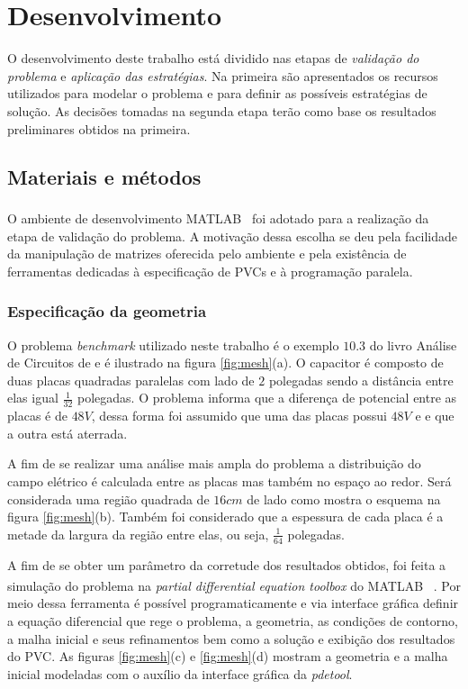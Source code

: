 \documentclass[
    12pt,               %
    openright,          %
    oneside,
    a4paper,            %
    english,            %
    french,             %
    spanish,            %
    brazil              %
    ]{abntex2}
\newcommand{\matlab}{MATLAB\textsuperscript{\textregistered} \ }
\begin{document}
\chapter{Desenvolvimento}

O desenvolvimento deste trabalho está  dividido nas etapas de \textit{validação do problema} e \textit{aplicação das estratégias}. Na primeira são apresentados os recursos utilizados para modelar o problema e para definir as possíveis estratégias de solução. As decisões tomadas na segunda etapa terão como base os resultados preliminares obtidos na primeira. 

\section{Materiais e métodos}
O ambiente de desenvolvimento \matlab foi adotado para a realização da etapa de validação do problema. A motivação dessa escolha se deu pela facilidade da manipulação de matrizes oferecida pelo ambiente e pela existência de ferramentas dedicadas à especificação de PVCs e à programação paralela.

\subsection{Especificação da geometria}
O problema \textit{benchmark} utilizado neste trabalho é o exemplo $10.3$ do livro Análise de Circuitos de  e é ilustrado na figura \ref{fig:mesh}{(a)}. O capacitor é composto de duas placas quadradas paralelas com lado de $2$ polegadas sendo a distância entre elas igual $\frac{1}{32}$ polegadas. O problema informa que a diferença de potencial entre as placas é de $48V$, dessa forma foi assumido que uma das placas possui $48V$ e e que a outra está aterrada.

A fim de se realizar uma análise mais ampla do problema a distribuição do campo elétrico é calculada entre as placas mas também no espaço ao redor. Será considerada uma região quadrada de $16cm$ de lado como mostra o esquema na figura \ref{fig:mesh}{(b)}. Também foi considerado que a espessura de cada placa é a metade da largura da região entre elas, ou seja, $\frac{1}{64}$ polegadas.


A fim de se obter um parâmetro da corretude dos resultados obtidos, foi feita a simulação do problema na \textit{partial differential equation toolbox} do \matlab. Por meio dessa ferramenta é possível programaticamente e via interface gráfica definir a equação diferencial que rege o problema, a geometria, as condições de contorno, a malha inicial e seus refinamentos bem como a solução e exibição dos resultados do PVC. As figuras \ref{fig:mesh}{(c)} e \ref{fig:mesh}{(d)} mostram a geometria e a malha inicial modeladas com o auxílio da interface gráfica da \textit{pdetool}.
\end{document}
